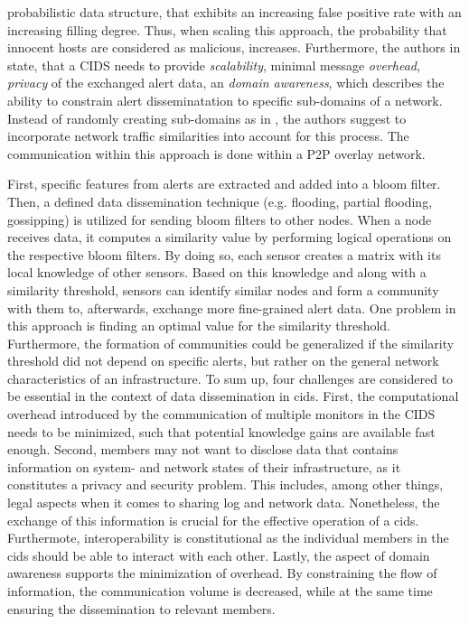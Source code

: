 \documentclass[../../main.tex]{subfiles}
\begin{document}
probabilistic data structure, that exhibits an increasing false positive rate with an increasing filling degree. Thus, when scaling this approach, the probability that innocent hosts are considered as malicious, increases. Furthermore, the authors in \cite{Vasilomanolakis2015SkipMon} state, that a CIDS needs to provide \textit{scalability}, minimal message \textit{overhead}, \textit{privacy} of the exchanged alert data, an \textit{domain awareness}, which describes the ability to constrain alert disseminatation to specific sub-domains of a network. Instead of randomly creating sub-domains as in \cite{Locasto2005}, the authors suggest to incorporate network traffic similarities into account for this process. The communication within this approach is done within a P2P overlay network. 

First, specific features from alerts are extracted and added into a bloom filter. Then, a defined data dissemination technique (e.g. flooding, partial flooding, gossipping) is utilized for sending bloom filters to other nodes. When a node receives data, it computes a similarity value by performing logical operations on the respective bloom filters. By doing so, each sensor creates a matrix with its local knowledge of other sensors. Based on this knowledge and along with a similarity threshold, sensors can identify similar nodes and form a community with them to, afterwards, exchange more fine-grained alert data. One problem in this approach is finding an optimal value for the similarity threshold. Furthermore, the formation of communities could be generalized if the similarity threshold did not depend on specific alerts, but rather on the general network characteristics of an infrastructure. To sum up, four challenges are considered to be essential in the context of data dissemination in \gls{cids}. First, the computational overhead introduced by the communication of multiple monitors in the CIDS needs to be minimized, such that potential knowledge gains are available fast enough. Second, members may not want to disclose data that contains information on system- and network states of their infrastructure, as it constitutes a privacy and security problem. This includes, among other things, legal aspects when it comes to sharing log and network data. Nonetheless, the exchange of this information is crucial for the effective operation of a \gls{cids}. Furthermote, interoperability is constitutional as the individual members in the \gls{cids} should be able to interact with each other. Lastly, the aspect of domain awareness supports the minimization of overhead. By constraining the
flow of information, the communication volume is decreased, while at the same time
ensuring the dissemination to relevant members.
\end{document}
